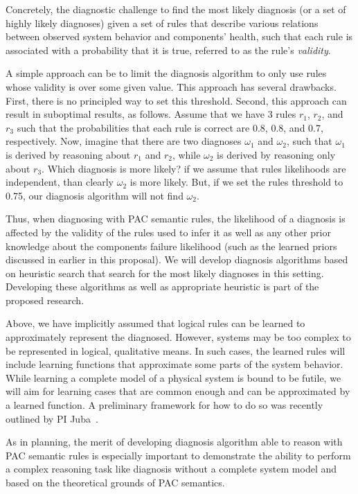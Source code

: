 \documentclass[12pt]{article}
\begin{document}
Concretely, the diagnostic challenge to find the most likely diagnosis (or a set of highly likely diagnoses) given a set of rules that describe various relations between observed system behavior and components' health, such that each rule is associated with a probability that it is true, referred to as the rule's {\em validity}. 

A simple approach can be to limit the diagnosis algorithm to only use rules whose validity is over some given value. This approach has several drawbacks. First, there is no principled way to set this threshold. Second, this approach can result in suboptimal results, as follows. 
Assume that we have 3 rules $r_1$, $r_2$, and $r_3$ such that the probabilities that each rule is correct are 0.8, 0.8, and 0.7, respectively. 
Now, imagine that there are two diagnoses $\omega_1$ and $\omega_2$, such that $\omega_1$ is derived by reasoning about $r_1$ and $r_2$, while $\omega_2$ is derived by reasoning only about $r_3$. Which diagnosis is more likely? 
if we assume that rules likelihoods are independent, than clearly $\omega_2$ is more likely. But, if we set the rules threshold to 0.75, our diagnosis algorithm will not find $\omega_2$. 

Thus, when diagnosing with PAC semantic rules,  the likelihood of a diagnosis is affected by  the validity of the rules used to infer it as well as any other prior knowledge about the components failure likelihood (such as the learned priors discussed in earlier in this proposal). We will develop diagnosis algorithms based on heuristic search that search for the most likely diagnoses in this setting. Developing these algorithms as well as appropriate heuristic is part of the proposed research. 


Above, we have implicitly assumed that logical rules can be learned to approximately represent the  diagnosed. However, systems may be too complex to be represented in logical, qualitative means. In such cases, the learned rules will include learning functions that approximate some parts of the system behavior. While learning a complete model of a physical system is bound to be futile, we will aim for learning cases that are common enough and can be approximated by a learned function. A preliminary framework for how to do so was recently outlined by PI Juba~\cite{juba2016aaai,juba2016conditional}.




As in planning, the merit of developing diagnosis algorithm able to reason with PAC semantic rules is especially important to demonstrate the ability to perform a complex reasoning task like diagnosis without a complete system model and based on the theoretical grounds of PAC semantics. 
\end{document}
